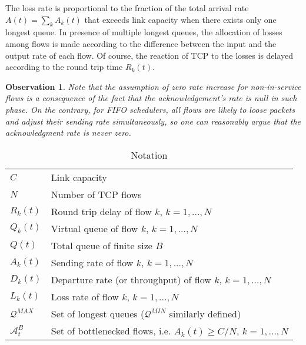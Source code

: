 \documentclass[a4paper,oneside, 11pt]{article}
\newcommand{\A}{ {\mathcal{A}} }
\newcommand{\Q}{ {\mathcal{Q}} }
\newtheorem{obs}[theorem]{Observation}
\begin{document}
The loss rate is proportional to the fraction of the total arrival rate $A(t)=\sum_k A_k(t)$ that
exceeds link capacity when there exists only one longest queue. In presence of multiple longest queues, the allocation of losses among flows is made according to the difference between the input and the output rate of each flow.
Of course, the reaction of TCP to the losses is delayed according to the round trip time $R_k(t)$.\begin{obs}
Note that the assumption of zero rate increase for non-in-service flows is a consequence of the fact that the acknowledgement's rate is null in such phase. On the contrary, for FIFO schedulers, all flows are likely to loose packets and adjust their sending rate simultaneously, so  one can reasonably argue that the acknowledgment rate is never zero.
\end{obs}
\begin{table}[tb]
\begin{footnotesize}
\centering
\begin{tabular}{|l|l|}
\hline
 $C$ & Link capacity   \\
 $N$ & Number of TCP flows  \\
 $R_k(t)$ & Round trip delay of flow $k$, $k=1,...,N$ \\
 $Q_k(t)$ & Virtual queue of flow $k$, $k=1,...,N$ \\
 $Q(t)$ & Total queue of finite size $B$ \\
 $A_k(t)$ & Sending rate of flow $k$, $k=1,...,N$\\
 $D_k(t)$ & Departure rate (or throughput) of flow $k$, $k=1,...,N$\\
 $L_k(t)$ & Loss rate of flow $k$, $k=1,...,N$\\
 $\Q^{MAX}$ & Set of longest queues ($\Q^{MIN}$ similarly defined)\\
 $\A_t^B$  & Set of bottlenecked flows, i.e. $A_k(t)\ge C/N$, $k=1,...,N$ \\
\hline
\end{tabular}
\caption{Notation}\label{tab:notation}
\end{footnotesize}
\end{table}
\end{document}
